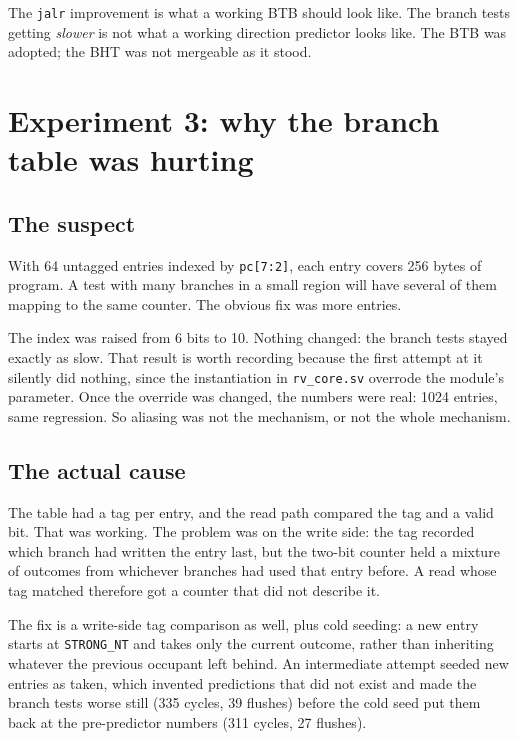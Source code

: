 \documentclass[11pt]{article}
\begin{document}
The \texttt{jalr} improvement is what a working BTB should look like. The branch tests getting
\emph{slower} is not what a working direction predictor looks like. The BTB was adopted; the BHT
was not mergeable as it stood.

\section{Experiment 3: why the branch table was hurting}

\subsection{The suspect}

With 64 untagged entries indexed by \texttt{pc[7:2]}, each entry covers 256 bytes of program.
A test with many branches in a small region will have several of them mapping to the same
counter. The obvious fix was more entries.

The index was raised from 6 bits to 10. Nothing changed: the branch tests stayed exactly as
slow. That result is worth recording because the first attempt at it silently did nothing, since
the instantiation in \texttt{rv\_core.sv} overrode the module's parameter. Once the override was
changed, the numbers were real: 1024 entries, same regression. So aliasing was not the
mechanism, or not the whole mechanism.

\subsection{The actual cause}

The table had a tag per entry, and the read path compared the tag and a valid bit. That was
working. The problem was on the write side: the tag recorded which branch had written the entry
last, but the two-bit counter held a mixture of outcomes from whichever branches had used that
entry before. A read whose tag matched therefore got a counter that did not describe it.

The fix is a write-side tag comparison as well, plus cold seeding: a new entry starts at
\texttt{STRONG\_NT} and takes only the current outcome, rather than inheriting whatever the
previous occupant left behind. An intermediate attempt seeded new entries as taken, which
invented predictions that did not exist and made the branch tests worse still (335 cycles, 39
flushes) before the cold seed put them back at the pre-predictor numbers (311 cycles, 27
flushes).
\end{document}
